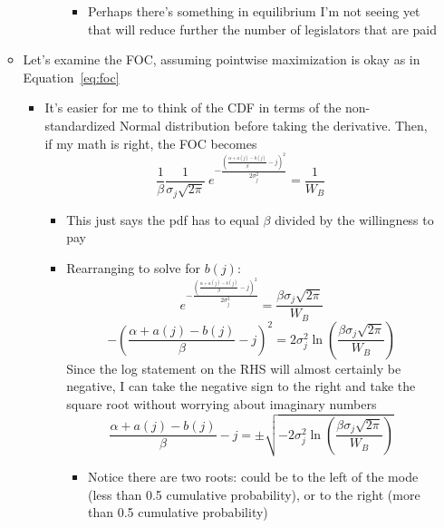 \documentclass[12pt]{article}
\begin{document}
\begin{enumerate}
\begin{itemize}
\begin{itemize}
\begin{itemize}
\begin{itemize}
										\item Perhaps there's something in equilibrium I'm not seeing yet that will reduce further the number of legislators that are paid
									\end{itemize}
						\end{itemize}
				\end{itemize}
			\item Let's examine the FOC, assuming pointwise maximization is okay as in Equation~\ref{eq:foc}
				\begin{itemize}
					\item It's easier for me to think of the CDF in terms of the non-standardized Normal distribution before taking the derivative. Then, if my math is right, the FOC becomes
						\begin{equation}
							  \frac{1}{\beta}\frac{1}{\sigma_j \sqrt{2\pi}} \: e^{- \frac{\left(\frac{\alpha + a(j) - b(j)}{\beta} - j\right)^2}{2\sigma_j^2} }= \frac{1}{W_B} 
								\label{eq:focB2}
						\end{equation}
							\begin{itemize}
								\item This just says the pdf has to equal $\beta$ divided by the willingness to pay
								\item Rearranging to solve for $b(j)$:
									\begin{equation}
							  		e^{- \frac{\left(\frac{\alpha + a(j) - b(j)}{\beta} - j\right)^2}{2\sigma_j^2} }= \frac{\beta\sigma_j \sqrt{2\pi}}{W_B} 
									\end{equation}
									\begin{equation}
							  		- \left(\frac{\alpha + a(j) - b(j)}{\beta} - j\right)^2 =2\sigma_j^2 \ln\left(\frac{\beta\sigma_j \sqrt{2\pi}}{W_B} \right)
									\end{equation}
								Since the log statement on the RHS will almost certainly be negative, I can take the negative sign to the right and take the square root without worrying about imaginary numbers
								  \begin{equation}
							  		\frac{\alpha + a(j) - b(j)}{\beta} - j = \pm \sqrt{-2\sigma_j^2 \ln\left(\frac{\beta\sigma_j \sqrt{2\pi}}{W_B} \right)}
									\end{equation}
										\begin{itemize}
											\item Notice there are two roots: could be to the left of the mode (less than 0.5 cumulative probability), or to the right (more than 0.5 cumulative probability)

\end{itemize}
\end{itemize}
\end{itemize}
\end{itemize}
\end{enumerate}
\end{document}
